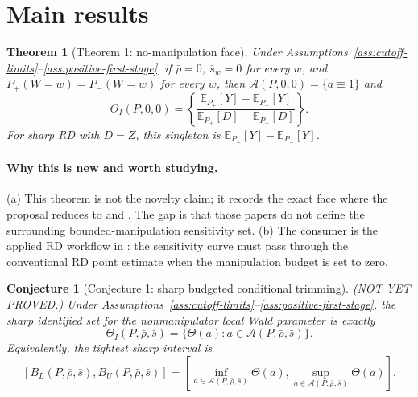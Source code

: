 \documentclass[11pt]{article}
\newcommand{\E}{\mathbb{E}}
\theoremstyle{definition}
\theoremstyle{plain}
\newtheorem{theorem}{Theorem}
\newtheorem{conjecture}{Conjecture}
\theoremstyle{remark}
\begin{document}
\section{Main results}
\begin{theorem}[Theorem 1: no-manipulation face]\label{thm:no-manipulation-face}
Under Assumptions~\ref{ass:cutoff-limits}--\ref{ass:positive-first-stage}, if
\(\bar\rho=0\), \(\bar s_w=0\) for every \(w\), and \(P_+(W=w)=P_-(W=w)\) for every \(w\),
then \(\mathcal A(P,0,0)=\{a\equiv1\}\) and
\[
  \Theta_I(P,0,0)=
  \left\{
  \frac{\E_{P_+}[Y]-\E_{P_-}[Y]}{\E_{P_+}[D]-\E_{P_-}[D]}
  \right\}.
\]
For sharp RD with \(D=Z\), this singleton is \(\E_{P_+}[Y]-\E_{P_-}[Y]\).
\end{theorem}

\paragraph{Why this is new and worth studying.}
(a) This theorem is not the novelty claim; it records the exact face where the proposal
reduces to \citet{HahnToddVanDerKlaauw2001} and \citet{Lee2008}.  The gap is that those
papers do not define the surrounding bounded-manipulation sensitivity set.  (b) The
consumer is the applied RD workflow in \citet{CattaneoIdroboTitiunik2020}: the sensitivity
curve must pass through the conventional RD point estimate when the manipulation budget is
set to zero.

\begin{conjecture}[Conjecture 1: sharp budgeted conditional trimming]\label{conj:sharp-budgeted-trim}
(NOT YET PROVED.)  Under Assumptions~\ref{ass:cutoff-limits}--\ref{ass:positive-first-stage},
the sharp identified set for the nonmanipulator local Wald parameter is exactly
\[
  \Theta_I(P,\bar\rho,\bar s)
  =
  \{\Theta(a):a\in\mathcal A(P,\bar\rho,\bar s)\}.
\]
Equivalently, the tightest sharp interval is
\[
  [B_L(P,\bar\rho,\bar s),B_U(P,\bar\rho,\bar s)]
  =
  \left[
  \inf_{a\in\mathcal A(P,\bar\rho,\bar s)}\Theta(a),
  \sup_{a\in\mathcal A(P,\bar\rho,\bar s)}\Theta(a)
  \right].
\]
\end{conjecture}
\end{document}
